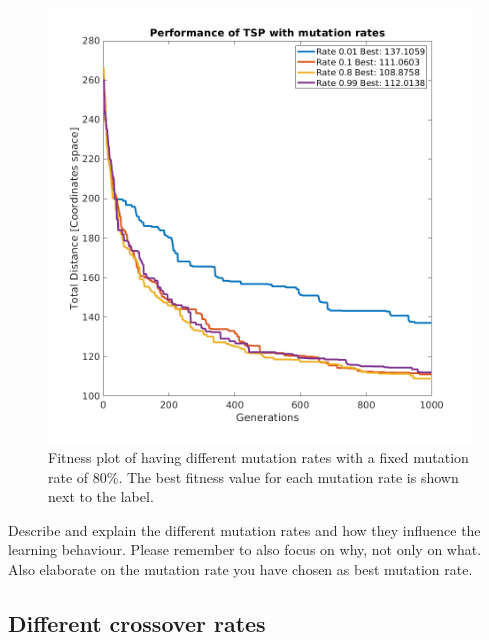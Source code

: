 \documentclass[a4paper, 12pt]{article}
\begin{document}
\begin{figure}[h!]
	\centering
	\includegraphics[width=1.0\textwidth]{images/MutationRatesVsCrossoverRate_80.png}
	\caption{Fitness plot of having different mutation rates with a fixed mutation rate of 80\%. The best fitness value for each mutation rate is shown next to the label. \label{fig:crossfig}}
\end{figure}

Describe and explain the different mutation rates and how they influence the learning behaviour. Please remember to also focus on why, not only on what.
Also elaborate on the mutation rate you have chosen as best mutation rate.

\newpage

\subsection{Different crossover rates}
\end{document}
